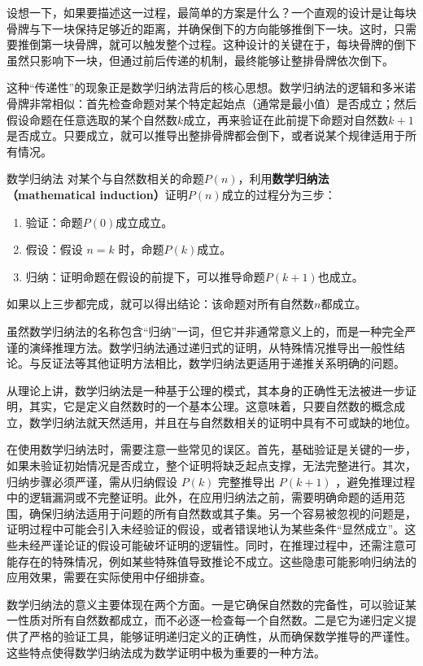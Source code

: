 设想一下，如果要描述这一过程，最简单的方案是什么？一个直观的设计是让每块骨牌与下一块保持足够近的距离，并确保倒下的方向能够推倒下一块。这时，只需要推倒第一块骨牌，就可以触发整个过程。这种设计的关键在于，每块骨牌的倒下虽然只影响下一块，但通过前后传递的机制，最终能够让整排骨牌依次倒下。

这种“传递性”的现象正是数学归纳法背后的核心思想。数学归纳法的逻辑和多米诺骨牌非常相似：首先检查命题对某个特定起始点（通常是最小值）是否成立；然后假设命题在任意选取的某个自然数$k$成立，再来验证在此前提下命题对自然数$k+1$是否成立。只要成立，就可以推导出整排骨牌都会倒下，或者说某个规律适用于所有情况。

\begin{definition}{数学归纳法}
对某个与自然数相关的命题$P(n)$，利用\textbf{数学归纳法（mathematical induction）}证明$P(n)$成立的过程分为三步：
\begin{enumerate}
\item 验证：命题$P(0)$成立成立。
\item 假设：假设 $n = k$ 时，命题$P(k)$成立。
\item 归纳：证明命题在假设的前提下，可以推导命题$P(k+1)$也成立。
\end{enumerate}
如果以上三步都完成，就可以得出结论：该命题对所有自然数$n$都成立。
\end{definition}

虽然数学归纳法的名称包含“归纳”一词，但它并非通常意义上的，而是一种完全严谨的演绎推理方法。数学归纳法通过递归式的证明，从特殊情况推导出一般性结论。与反证法等其他证明方法相比，数学归纳法更适用于递推关系明确的问题。

从理论上讲，数学归纳法是一种基于公理的模式，其本身的正确性无法被进一步证明，其实，它是定义自然数时的一个基本公理。这意味着，只要自然数的概念成立，数学归纳法就天然适用，并且在与自然数相关的证明中具有不可或缺的地位。

在使用数学归纳法时，需要注意一些常见的误区。首先，基础验证是关键的一步，如果未验证初始情况是否成立，整个证明将缺乏起点支撑，无法完整进行。其次，归纳步骤必须严谨，需从归纳假设  $P(k)$  完整推导出  $P(k+1)$ ，避免推理过程中的逻辑漏洞或不完整证明。此外，在应用归纳法之前，需要明确命题的适用范围，确保归纳法适用于问题的所有自然数或其子集。另一个容易被忽视的问题是，证明过程中可能会引入未经验证的假设，或者错误地认为某些条件“显然成立”。这些未经严谨论证的假设可能破坏证明的逻辑性。同时，在推理过程中，还需注意可能存在的特殊情况，例如某些特殊值导致推论不成立。这些隐患可能影响归纳法的应用效果，需要在实际使用中仔细排查。

数学归纳法的意义主要体现在两个方面。一是它确保自然数的完备性，可以验证某一性质对所有自然数都成立，而不必逐一检查每一个自然数。二是它为递归定义提供了严格的验证工具，能够证明递归定义的正确性，从而确保数学推导的严谨性。这些特点使得数学归纳法成为数学证明中极为重要的一种方法。

